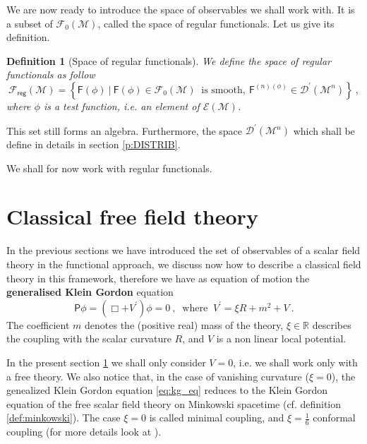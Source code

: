 \documentclass[11pt]{book}
\newcommand{\Dcal}{\mathcal{D}}
\newcommand{\Ecal}{\mathcal{E}}
\newcommand{\Fcal}{\mathcal{F}}
\newcommand{\Mcal}{\mathcal{M}}
\newcommand{\Rbb}{\mathbb{R}}
\newcommand{\Fsf}{\mathsf{F}}
\newcommand{\Psf}{\mathsf{P}}
\theoremstyle{break}
\newtheorem{definition}{Definition}[chapter]
\begin{document}
We are now ready to introduce the space of observables we shall work with. It is a subset of $\Fcal_0(\Mcal)$, called the space of regular functionals. Let us give its definition.


\begin{definition}[Space of regular functionals]\label{def:obs_reg}
We define the space of regular functionals as follow
%
\begin{equation*}
\Fcal_{\mathsf{reg}}(\Mcal) = \left\{ \Fsf(\phi) \ \bigg| \ \Fsf(\phi) \in \Fcal_0(\Mcal) \ \mbox{ is smooth}, \ \Fsf^{(n)(\phi)} \in \Dcal^\prime(\Mcal^{n}) \right\} \ ,
\end{equation*}
%
where $\phi$ is a test function, i.e. an element of $\Ecal(\Mcal)$.
\end{definition}

This set still forms an algebra. Furthermore, the space $\Dcal^\prime(\Mcal^{n})$ which shall be define in details in section \ref{p:DISTRIB}.


We shall for now work with regular functionals. 


\section{Classical free field theory}\label{p:CLASSICAL}


In the previous sections we have introduced the set of observables of a scalar field theory in the functional approach, we discuss now how to describe a classical field theory in this framework, therefore we have as equation of motion the \textbf{generalised Klein Gordon} equation
%
\begin{equation} 
\Psf \phi = \left( \Box + V^\prime \right) \phi = 0 \ , \
\mbox{ where } \ V^\prime = \xi R + m^2 + V \ . 
\label{eq:kg_eq}
\end{equation}
%
The coefficient $m$ denotes the (positive real) mass of the theory, $\xi \in \Rbb$ describes the coupling with the scalar curvature $R$, and $V$ is a non linear local potential.


In the present section \ref{p:CLASSICAL} we shall only consider $V=0$, i.e. we shall work only with a free theory. We also notice that, in the case of vanishing curvature ($\xi=0$), the genealized Klein Gordon equation \eqref{eq:kg_eq} reduces to the Klein Gordon equation of the free scalar field theory on Minkowski spacetime (cf. definition \ref{def:minkowski}). The case $\xi=0$ is called minimal coupling, and $\xi=\frac16$ conformal coupling (for more details look at \cite{waldGR}).
\end{document}
